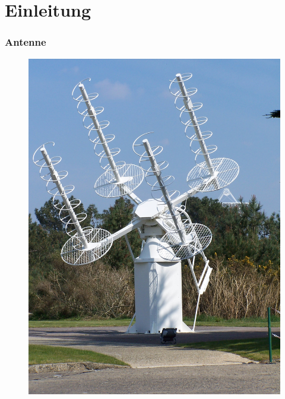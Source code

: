 

\subtitle{Technik 11: \\
  Antennentechnik \\[2em]}
\date{Stand 21.11.2016}


\section*{Einleitung}

\begin{frame}
  \frametitle{Antenne}
  \begin{center}
    \begin{figure}
      \includegraphics[width=.5\textwidth,height=.7\textheight,keepaspectratio]{e11/Traqueur_acquisition.JPG}
    \end{figure}
  \end{center}
\end{frame}

